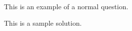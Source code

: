 
This is an example of a normal question.

\begin{solution}
  This is a sample solution.
\end{solution}
